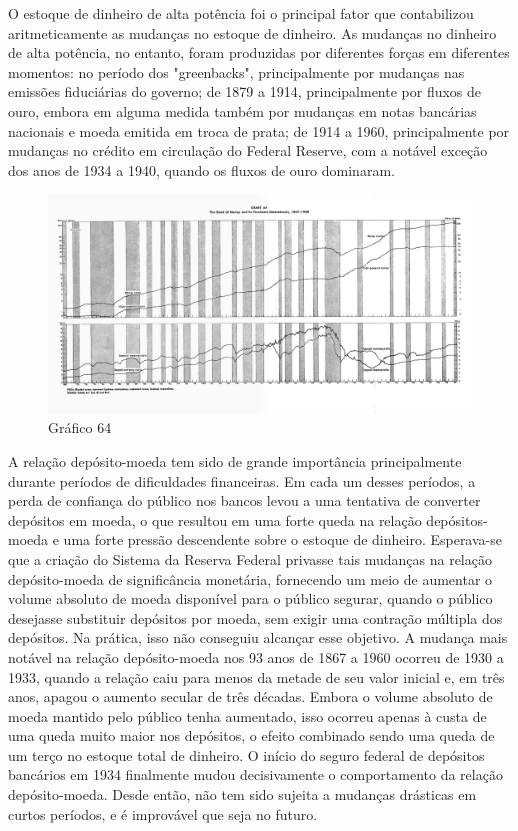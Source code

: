 \documentclass[a4paper,12pt]{article}[abntex2]
\begin{document}
O estoque de dinheiro de alta potência foi o principal fator que contabilizou aritmeticamente as mudanças no estoque de dinheiro. As mudanças no dinheiro de alta potência, no entanto, foram produzidas por diferentes forças em diferentes momentos: no período dos "greenbacks", principalmente por mudanças nas emissões fiduciárias do governo; de 1879 a 1914, principalmente por fluxos de ouro, embora em alguma medida também por mudanças em notas bancárias nacionais e moeda emitida em troca de prata; de 1914 a 1960, principalmente por mudanças no crédito em circulação do Federal Reserve, com a notável exceção dos anos de 1934 a 1940, quando os fluxos de ouro dominaram.

\begin{figure}[H]
    \centering
    \caption{Gráfico 64}
    \includegraphics[width=1.0\textwidth]{4º Período/História do Pensamento Econômico/Tradução HPE/Tradução Tópico 9.1/Gráfico 64.png}
    \end{figure}

A relação depósito-moeda tem sido de grande importância principalmente durante períodos de dificuldades financeiras. Em cada um desses períodos, a perda de confiança do público nos bancos levou a uma tentativa de converter depósitos em moeda, o que resultou em uma forte queda na relação depósitos-moeda e uma forte pressão descendente sobre o estoque de dinheiro. Esperava-se que a criação do Sistema da Reserva Federal privasse tais mudanças na relação depósito-moeda de significância monetária, fornecendo um meio de aumentar o volume absoluto de moeda disponível para o público segurar, quando o público desejasse substituir depósitos por moeda, sem exigir uma contração múltipla dos depósitos. Na prática, isso não conseguiu alcançar esse objetivo. A mudança mais notável na relação depósito-moeda nos 93 anos de 1867 a 1960 ocorreu de 1930 a 1933, quando a relação caiu para menos da metade de seu valor inicial e, em três anos, apagou o aumento secular de três décadas. Embora o volume absoluto de moeda mantido pelo público tenha aumentado, isso ocorreu apenas à custa de uma queda muito maior nos depósitos, o efeito combinado sendo uma queda de um terço no estoque total de dinheiro. O início do seguro federal de depósitos bancários em 1934 finalmente mudou decisivamente o comportamento da relação depósito-moeda. Desde então, não tem sido sujeita a mudanças drásticas em curtos períodos, e é improvável que seja no futuro.
\end{document}

